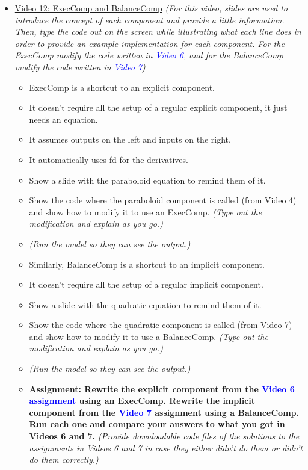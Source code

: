 \documentclass[12pt, letterpaper]{article}
\begin{document}
\begin{itemize}
	\item \underline{Video 12: ExecComp and BalanceComp} \textit{(For this video, slides are used to introduce the concept of each component and provide a little information. Then, type the code out on the screen while illustrating what each line does in order to provide an example implementation for each component. For the ExecComp modify the code written in \textcolor{blue}{Video 6}, and for the BalanceComp modify the code written in \textcolor{blue}{Video 7})} 
		\begin{itemize}
			\item ExecComp is a shortcut to an explicit component. 
			\item It doesn’t require all the setup of a regular explicit component, it just needs an equation.
			\item It assumes outputs on the left and inputs on the right. 
			\item It automatically uses fd for the derivatives. 
			\item Show a slide with the paraboloid equation to remind them of it.
			\item Show the code where the paraboloid component is called (from Video 4) and show how to modify it to use an ExecComp. \textit{(Type out the modification and explain as you go.)}
			\item \textit{(Run the model so they can see the output.)}
			\item Similarly, BalanceComp is a shortcut to an implicit component.
			\item It doesn’t require all the setup of a regular implicit component.
			\item Show a slide with the quadratic equation to remind them of it.
			\item Show the code where the quadratic component is called (from Video 7) and show how to modify it to use a BalanceComp. \textit{(Type out the modification and explain as you go.)}
			\item \textit{(Run the model so they can see the output.)}
			\item \textbf{Assignment: Rewrite the explicit component from the \textcolor{blue}{Video 6 assignment} using an ExecComp. Rewrite the implicit component from the \textcolor{blue}{Video 7} assignment using a BalanceComp. Run each one and compare your answers to what you got in Videos 6 and 7.} \textit{(Provide downloadable code files of the solutions to the assignments in Videos 6 and 7 in case they either didn't do them or didn't do them correctly.)}
		\end{itemize}


\end{itemize}
\end{document}
